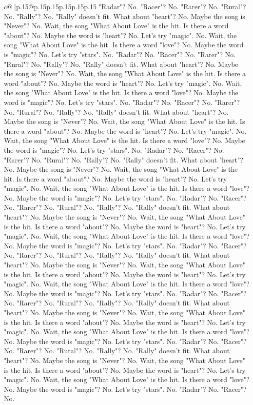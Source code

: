 \documentclass{article}
\begin{document}
{\begin{supertabular}{c@{$\;$}|p{.15\linewidth}@{}p{.15\linewidth}p{.15\linewidth}p{.15\linewidth}p{.15\linewidth}p{.15\linewidth}}
{{{"Radar"? No. "Racer"? No. "Rarer"? No. "Rural"? No. "Rally"? No. "Rally" doesn't fit. What about "heart"? No. Maybe the song is "Never"? No. Wait, the song "What About Love" is the hit. Is there a word "about"? No. Maybe the word is "heart"? No. Let's try "magic". No. Wait, the song "What About Love" is the hit. Is there a word "love"? No. Maybe the word is "magic"? No. Let's try "stars". No. "Radar"? No. "Racer"? No. "Rarer"? No. "Rural"? No. "Rally"? No. "Rally" doesn't fit. What about "heart"? No. Maybe the song is "Never"? No. Wait, the song "What About Love" is the hit. Is there a word "about"? No. Maybe the word is "heart"? No. Let's try "magic". No. Wait, the song "What About Love" is the hit. Is there a word "love"? No. Maybe the word is "magic"? No. Let's try "stars". No. "Radar"? No. "Racer"? No. "Rarer"? No. "Rural"? No. "Rally"? No. "Rally" doesn't fit. What about "heart"? No. Maybe the song is "Never"? No. Wait, the song "What About Love" is the hit. Is there a word "about"? No. Maybe the word is "heart"? No. Let's try "magic". No. Wait, the song "What About Love" is the hit. Is there a word "love"? No. Maybe the word is "magic"? No. Let's try "stars". No. "Radar"? No. "Racer"? No. "Rarer"? No. "Rural"? No. "Rally"? No. "Rally" doesn't fit. What about "heart"? No. Maybe the song is "Never"? No. Wait, the song "What About Love" is the hit. Is there a word "about"? No. Maybe the word is "heart"? No. Let's try "magic". No. Wait, the song "What About Love" is the hit. Is there a word "love"? No. Maybe the word is "magic"? No. Let's try "stars". No. "Radar"? No. "Racer"? No. "Rarer"? No. "Rural"? No. "Rally"? No. "Rally" doesn't fit. What about "heart"? No. Maybe the song is "Never"? No. Wait, the song "What About Love" is the hit. Is there a word "about"? No. Maybe the word is "heart"? No. Let's try "magic". No. Wait, the song "What About Love" is the hit. Is there a word "love"? No. Maybe the word is "magic"? No. Let's try "stars". No. "Radar"? No. "Racer"? No. "Rarer"? No. "Rural"? No. "Rally"? No. "Rally" doesn't fit. What about "heart"? No. Maybe the song is "Never"? No. Wait, the song "What About Love" is the hit. Is there a word "about"? No. Maybe the word is "heart"? No. Let's try "magic". No. Wait, the song "What About Love" is the hit. Is there a word "love"? No. Maybe the word is "magic"? No. Let's try "stars". No. "Radar"? No. "Racer"? No. "Rarer"? No. "Rural"? No. "Rally"? No. "Rally" doesn't fit. What about "heart"? No. Maybe the song is "Never"? No. Wait, the song "What About Love" is the hit. Is there a word "about"? No. Maybe the word is "heart"? No. Let's try "magic". No. Wait, the song "What About Love" is the hit. Is there a word "love"? No. Maybe the word is "magic"? No. Let's try "stars". No. "Radar"? No. "Racer"? No. "Rarer"? No. "Rural"? No. "Rally"? No. "Rally" doesn't fit. What about "heart"? No. Maybe the song is "Never"? No. Wait, the song "What About Love" is the hit. Is there a word "about"? No. Maybe the word is "heart"? No. Let's try "magic". No. Wait, the song "What About Love" is the hit. Is there a word "love"? No. Maybe the word is "magic"? No. Let's try "stars". No. "Radar"? No. "Racer"? No. }}}
\end{supertabular}}
\end{document}
